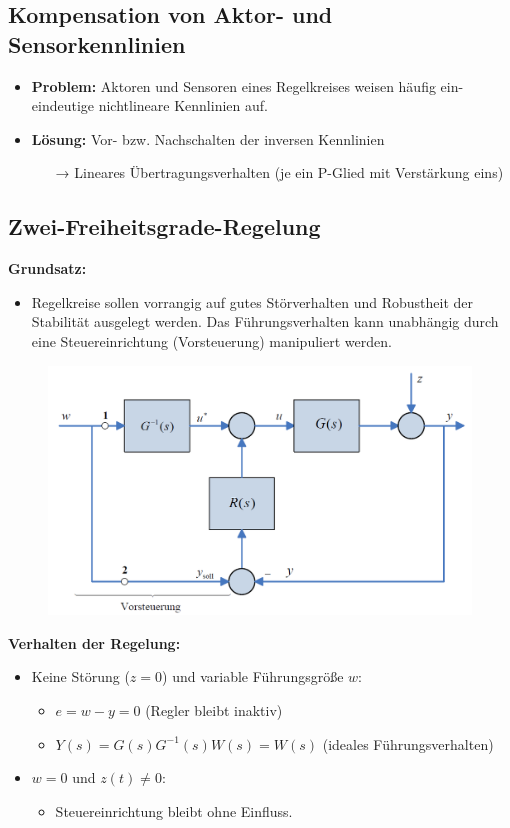 \documentclass[10pt,a4paper]{article}
\begin{document}
\subsection{Kompensation von Aktor- und Sensorkennlinien}
\begin{itemize}
	\item \textbf{Problem:} Aktoren und Sensoren eines Regelkreises weisen häufig ein-eindeutige nichtlineare Kennlinien auf.
	\item \textbf{Lösung:} Vor- bzw. Nachschalten der inversen Kennlinien
	\begin{itemize}
		\item[→] Lineares Übertragungsverhalten (je ein P-Glied mit Verstärkung eins)
	\end{itemize}
\end{itemize}

\subsection{Zwei-Freiheitsgrade-Regelung}
\textbf{Grundsatz:}
\begin{itemize}
	\item Regelkreise sollen vorrangig auf gutes Störverhalten und Robustheit der Stabilität ausgelegt werden. Das Führungsverhalten kann unabhängig durch eine Steuereinrichtung (Vorsteuerung) manipuliert werden.
\end{itemize}

\begin{figure}[H]
	\includegraphics[width=0.5\columnwidth]{imgs/abb7_2.png}
\end{figure}

\textbf{Verhalten der Regelung:}
\begin{itemize}
	\item Keine Störung ($z = 0$) und variable Führungsgröße $w$:
	\begin{itemize}
		\item $e = w - y = 0$ (Regler bleibt inaktiv)
		\item $Y(s) = G(s)G^{-1}(s)W(s) = W(s)$ (ideales Führungsverhalten)
	\end{itemize}
	\item $w = 0$ und $z(t) ≠ 0$:
	\begin{itemize}
		\item Steuereinrichtung bleibt ohne Einfluss.
	\end{itemize}
\end{itemize}
\end{document}
